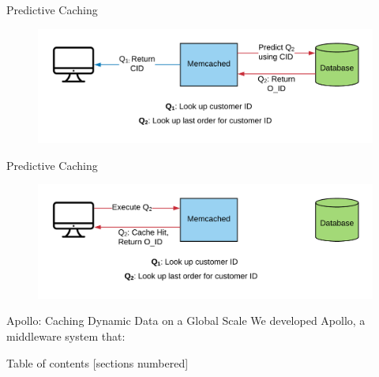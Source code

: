 \documentclass[10pt]{beamer}
\begin{document}
\begin{frame}{Predictive Caching}
    \begin{figure}
        \center
        \includegraphics[scale=0.17]{apollo_predictive_execution_4}
    \end{figure}
\end{frame}

\begin{frame}{Predictive Caching}
    \begin{figure}
        \center
        \includegraphics[scale=0.17]{apollo_predictive_execution_5}
    \end{figure}
\end{frame}

\begin{frame}{Apollo: Caching Dynamic Data on a Global Scale}
    We developed Apollo, a middleware system that:
    \begin{itemize}
    \end{itemize}
\end{frame}

\begin{frame}{Table of contents}
  [sections numbered]
  \tableofcontents[hideallsubsections]
\end{frame}
\end{document}
